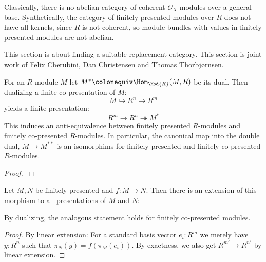 

Classically, there is no abelian category of coherent $\mathcal O_X$-modules over a general base.
Synthetically, the category of finitely presented modules over $R$ does not have all kernels,
since $R$ is not coherent, so module bundles with values in finitely presented modules are not abelian.

This section is about finding a suitable replacement category.
This section is joint work of Felix Cherubini, Dan Christensen and Thomas Thorbjørnsen.

\begin{theorem}
  For an $R$-module $M$ let $M^\ast\colonequiv \Hom_{\Mod{R}}(M,R)$ be its dual.
  Then dualizing a finite co-presentation of $M$:
  \[ M \hookrightarrow R^n \to R^m \]
  yields a finite presentation:
  \[ R^m \to R^n \twoheadrightarrow M^\ast \]
  This induces an anti-equivalence between finitely presented $R$-modules and finitely co-presented $R$-modules. In particular, the canonical map into the double dual, $M\to M^{\ast\ast}$ is an isomorphims for finitely presented and finitely co-presented $R$-modules.
\end{theorem}

\begin{proof}
  \cite{etale-draft}
\end{proof}


\begin{lemma}
  \label{presentation-extension}
  Let $M,N$ be finitely presented and $f:M\to N$.
  Then there is an extension of this morphism to all presentations of $M$ and $N$:
  \begin{center}
  \end{center}
  By dualizing, the analogous statement holds for finitely co-presented modules.
\end{lemma}

\begin{proof}
  By linear extension: For a standard basis vector $e_i:R^m$ we merely have $y:R^n$ such that $\pi_N(y)=f(\pi_M(e_i))$. By exactness, we also get $R^{m'}\to R^{n'}$ by linear extension.
\end{proof}

